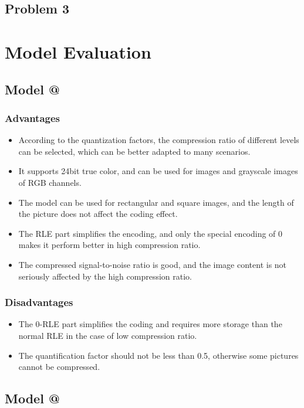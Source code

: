 \documentclass{mcmthesis}
\makeatletter
\newcommand{\Rmnum}[1]{\expandafter\@slowromancap\romannumeral #1@}
\makeatother
\begin{document}
\subsection{Problem 3}



\section{Model Evaluation}
\subsection{Model \Rmnum{1}}
\subsubsection{Advantages}
\begin{itemize}
  \item According to the quantization factors, the compression ratio of different levels can be selected, which can be better adapted to many scenarios.
  \item It supports 24bit true color, and can be used for images and grayscale images of RGB channels.
  \item The model can be used for rectangular and square images, and the length of the picture does not affect the coding effect.
  \item The RLE part simplifies the encoding, and only the special encoding of 0 makes it perform better in high compression ratio.
  \item The compressed signal-to-noise ratio is good, and the image content is not seriously affected by the high compression ratio.
\end{itemize}

\subsubsection{Disadvantages}
\begin{itemize}
  \item The 0-RLE part simplifies the coding and requires more storage than the normal RLE in the case of low compression ratio.
  \item The quantification factor should not be less than 0.5, otherwise some pictures cannot be compressed.
\end{itemize}

\subsection{Model \Rmnum{2}}
\end{document}
